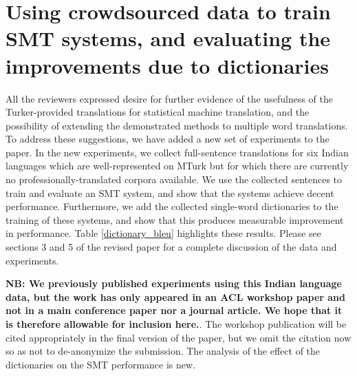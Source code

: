 \documentclass[11pt]{article}
\begin{document}

\section{Using crowdsourced data to train SMT systems, and evaluating the improvements due to dictionaries}\label{smt-results}

All the reviewers expressed desire for further evidence of the usefulness of the Turker-provided translations for statistical machine translation, and the possibility of extending the demonstrated methods to multiple word translations. 
To address these suggestions, we have added a new set of experiments to the paper.  In the new experiments, we collect full-sentence translations for six Indian languages which are well-represented on MTurk but for which there are currently no professionally-translated corpora available. We use the collected sentences to train and evaluate an SMT system, and show that the systems achieve decent performance. Furthermore, we add the collected single-word dictionaries to the training of these systems, and show that this produces measurable improvement in performance. Table \ref{dictionary_bleu} highlights these results. Please see sections 3 and 5 of the revised paper for a complete discussion of the data and experiments. 

{\bf NB: We previously published experiments using this Indian language data, but the work has only appeared in an ACL workshop paper and not in a main conference paper nor a journal article.  We hope that it is therefore allowable for inclusion here.}.   The workshop publication will be cited appropriately in the final version of the paper, but we omit the citation now so as not to de-anonymize the submission.   The analysis of the effect of the dictionaries on the SMT performance is new.
\end{document}
